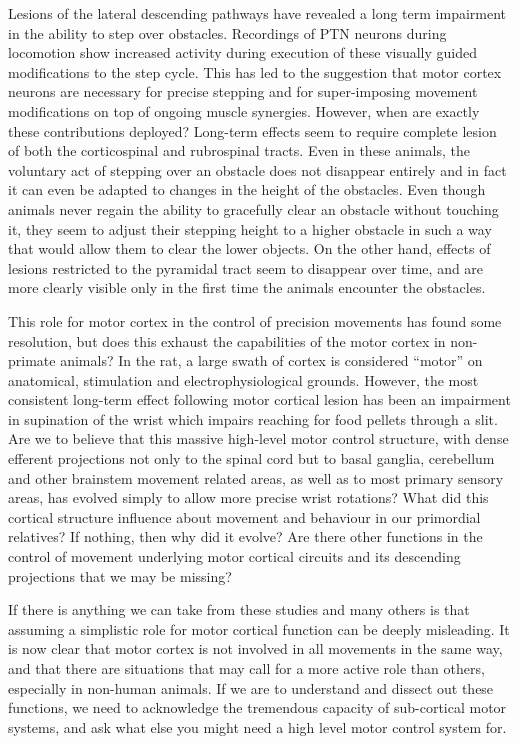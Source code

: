 Lesions of the lateral descending pathways have revealed a long term impairment in the ability to step over obstacles. Recordings of PTN neurons during locomotion show increased activity during execution of these visually guided modifications to the step cycle. This has led to the suggestion that motor cortex neurons are necessary for precise stepping and for super-imposing movement modifications on top of ongoing muscle synergies. However, when are exactly these contributions deployed? Long-term effects seem to require complete lesion of both the corticospinal and rubrospinal tracts. Even in these animals, the voluntary act of stepping over an obstacle does not disappear entirely and in fact it can even be adapted to changes in the height of the obstacles. Even though animals never regain the ability to gracefully clear an obstacle without touching it, they seem to adjust their stepping height to a higher obstacle in such a way that would allow them to clear the lower objects. On the other hand, effects of lesions restricted to the pyramidal tract seem to disappear over time, and are more clearly visible only in the first time the animals encounter the obstacles.

This role for motor cortex in the control of precision movements has found some resolution, but does this exhaust the capabilities of the motor cortex in non-primate animals? In the rat, a large swath of cortex is considered ``motor'' on anatomical, stimulation and electrophysiological grounds. However, the most consistent long-term effect following motor cortical lesion has been an impairment in supination of the wrist which impairs reaching for food pellets through a slit. Are we to believe that this massive high-level motor control structure, with dense efferent projections not only to the spinal cord but to basal ganglia, cerebellum and other brainstem movement related areas, as well as to most primary sensory areas, has evolved simply to allow more precise wrist rotations? What did this cortical structure influence about movement and behaviour in our primordial relatives? If nothing, then why did it evolve? Are there other functions in the control of movement underlying motor cortical circuits and its descending projections that we may be missing?

If there is anything we can take from these studies and many others is that assuming a simplistic role for motor cortical function can be deeply misleading. It is now clear that motor cortex is not involved in all movements in the same way, and that there are situations that may call for a more active role than others, especially in non-human animals. If we are to understand and dissect out these functions, we need to acknowledge the tremendous capacity of sub-cortical motor systems, and ask what else you might need a high level motor control system for.

